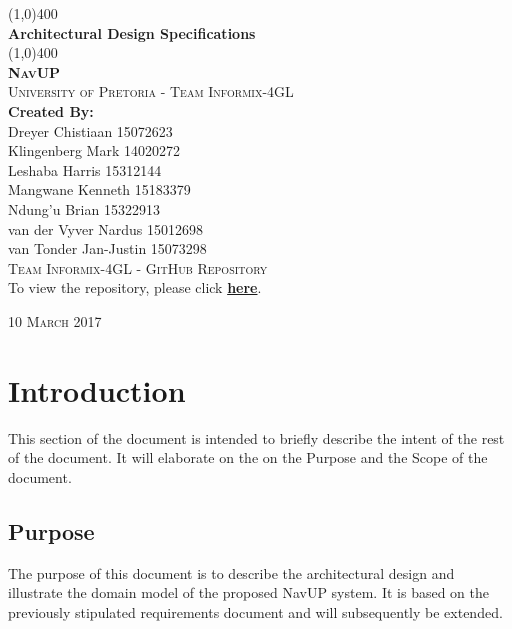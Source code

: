 \documentclass{article}
\begin{document}
	\begin{titlepage}
		\begin{center}

			\line(1,0){400}\\
			[6mm]
			\huge{
				\bfseries Architectural Design Specifications
			}\\
			[2mm]
			\line(1,0){400}\\
			[15mm]
			\textsc{\large{\textbf{NavUP}}}\\
			[4.5mm]
			\textsc{\large University of Pretoria - Team Informix-4GL}\\
			[20mm]
			\large{\textbf{Created By:}}\\
			[2mm]
			\large{
				Dreyer Chistiaan 15072623 \\
				Klingenberg Mark  14020272\\
				Leshaba Harris 15312144 \\
				Mangwane Kenneth 15183379 \\
				Ndung'u Brian 15322913 \\
				van der Vyver Nardus 15012698 \\
				van Tonder Jan-Justin 15073298
			}\\
			[30mm]
			
		\textsc{\Large Team Informix-4GL - GitHub Repository}\\[2mm]
			To view the repository, please click 
		\href{https://github.com/MarkKlingenberg/Informix-4gl}{\textbf{here}}. \\[45mm]
		\end{center}
		\begin{flushright}
			\textsc{\large 10 March 2017}
		\end{flushright}
	\end{titlepage}

	\cleardoublepage
	\thispagestyle{empty}
	\tableofcontents
	\cleardoublepage

	\thispagestyle{empty}
	\cleardoublepage
	\setcounter{page}{1}
	
	\section{Introduction}\label{sec: introduction}
		This section of the document is intended to briefly describe the intent of the rest of the document. It will elaborate on the on the Purpose and the Scope of the document.
		
		\subsection{Purpose}\label{sec: purpose}
			The purpose of this document is to describe the architectural design and illustrate the domain model of the proposed NavUP system. It is based on the previously stipulated requirements document and will subsequently be extended.\\
			
\end{document}
